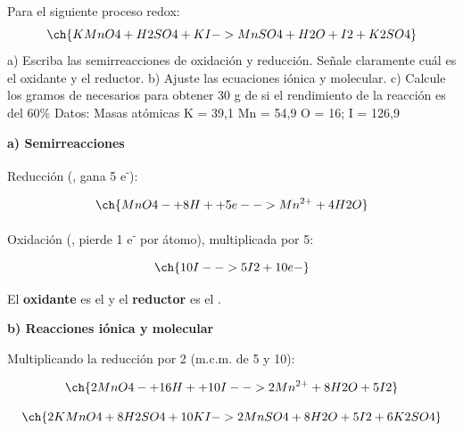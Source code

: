 \begin{exerciseEVAU}
    Para el siguiente proceso redox:
    \begin{equation*}
        \ch{KMnO4 + H2SO4 + KI -> MnSO4 + H2O + I2 + K2SO4}
    \end{equation*}
    a) Escriba las semirreacciones de oxidación y reducción. Señale claramente cuál es el oxidante y el reductor. b) Ajuste las ecuaciones iónica y molecular. c) Calcule los gramos de  necesarios para obtener 30 g de   si el rendimiento de la reacción es del 60\% Datos: Masas atómicas K = 39,1 Mn = 54,9 O = 16; I = 126,9

    \begin{solu}


        \textbf{a) Semirreacciones}

        Reducción (, gana 5 e\textsuperscript{-}):

        \begin{equation*}
            \ch{MnO4- + 8 H+ + 5 e- -> Mn^{2+} + 4 H2O}
        \end{equation*}

        Oxidación (, pierde 1 e\textsuperscript{-} por átomo), multiplicada por 5:

        \begin{equation*}
            \ch{10 I- -> 5 I2 + 10 e-}
        \end{equation*}

        El \textbf{oxidante} es el  y el \textbf{reductor} es el .

        \textbf{b) Reacciones iónica y molecular}

        Multiplicando la reducción por 2 (m.c.m. de 5 y 10):

        \begin{equation*}
            \ch{2 MnO4- + 16 H+ + 10 I- -> 2 Mn^{2+} + 8 H2O + 5 I2}
        \end{equation*}

        \begin{equation*}
            \ch{2 KMnO4 + 8 H2SO4 + 10 KI -> 2 MnSO4 + 8 H2O + 5 I2 + 6 K2SO4}
        \end{equation*}


\end{solu}
\end{exerciseEVAU}
